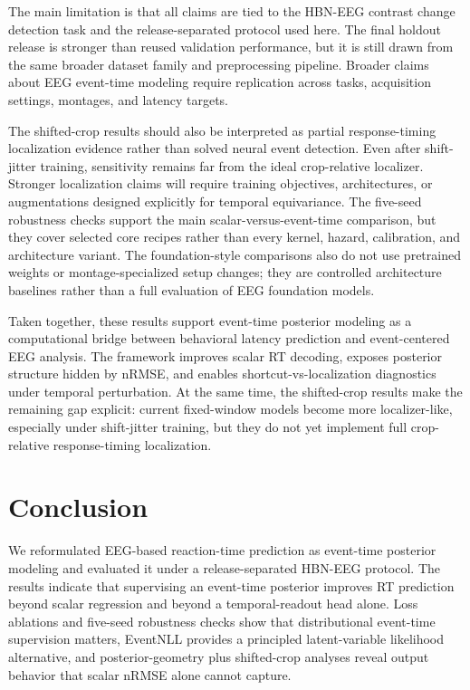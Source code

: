 \documentclass[12pt]{article}
\begin{document}
The main limitation is that all claims are tied to the HBN-EEG contrast change detection task and the release-separated protocol used here. The final holdout release is stronger than reused validation performance, but it is still drawn from the same broader dataset family and preprocessing pipeline. Broader claims about EEG event-time modeling require replication across tasks, acquisition settings, montages, and latency targets.

The shifted-crop results should also be interpreted as partial response-timing localization evidence rather than solved neural event detection. Even after shift-jitter training, sensitivity remains far from the ideal crop-relative localizer. Stronger localization claims will require training objectives, architectures, or augmentations designed explicitly for temporal equivariance. The five-seed robustness checks support the main scalar-versus-event-time comparison, but they cover selected core recipes rather than every kernel, hazard, calibration, and architecture variant. The foundation-style comparisons also do not use pretrained weights or montage-specialized setup changes; they are controlled architecture baselines rather than a full evaluation of EEG foundation models.

Taken together, these results support event-time posterior modeling as a computational bridge between behavioral latency prediction and event-centered EEG analysis. The framework improves scalar RT decoding, exposes posterior structure hidden by nRMSE, and enables shortcut-vs-localization diagnostics under temporal perturbation. At the same time, the shifted-crop results make the remaining gap explicit: current fixed-window models become more localizer-like, especially under shift-jitter training, but they do not yet implement full crop-relative response-timing localization.

\section{Conclusion}

We reformulated EEG-based reaction-time prediction as event-time posterior modeling and evaluated it under a release-separated HBN-EEG protocol. The results indicate that supervising an event-time posterior improves RT prediction beyond scalar regression and beyond a temporal-readout head alone. Loss ablations and five-seed robustness checks show that distributional event-time supervision matters, EventNLL provides a principled latent-variable likelihood alternative, and posterior-geometry plus shifted-crop analyses reveal output behavior that scalar nRMSE alone cannot capture.
\end{document}
